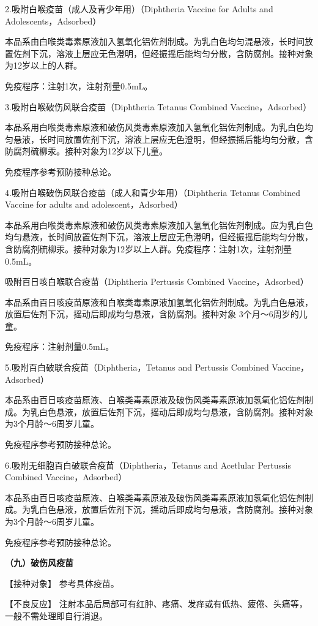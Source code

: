 2.吸附白喉疫苗（成人及青少年用）（Diphtheria Vaccine for Adults and
Adolescents，Adsorbed）

本品系由白喉类毒素原液加入氢氧化铝佐剂制成。为乳白色均匀混悬液，长时间放置佐剂下沉，溶液上层应无色澄明，但经振摇后能均匀分散，含防腐剂。接种对象为12岁以上的人群。

免疫程序：注射1次，注射剂量0.5mL。

3.吸附白喉破伤风联合疫苗（Diphtheria Tetanus Combined
Vaccine，Adsorbed）

本品系用白喉类毒素原液和破伤风类毒素原液加入氢氧化铝佐剂制成。为乳白色均匀悬液，长时间放置佐剂下沉，溶液上层应无色澄明，但经振摇后能均匀分散，含防腐剂硫柳汞。接种对象为12岁以下儿童。

免疫程序参考预防接种总论。

4.吸附白喉破伤风联合疫苗（成人和青少年用）（Diphtheria Tetanus Combined
Vaccine for adults and adolescent，Adsorbed）

本品系用白喉类毒素原液和破伤风类毒素原液加入氢氧化铝佐剂制成。应为乳白色均匀悬液，长时间放置佐剂下沉，溶液上层应无色澄明，但经振摇后能均匀分散，含防腐剂硫柳汞。接种对象为12岁以上人群。免疫程序：注射1次，注射剂量0.5mL。

吸附百日咳白喉联合疫苗（Diphtheria Pertussis Combined
Vaccine，Adsorbed）

本品系由百日咳疫苗原液和白喉类毒素原液加氢氧化铝佐剂制成。为乳白色悬液，放置后佐剂下沉，摇动后即成均匀悬液，含防腐剂。接种对象
3个月～6周岁的儿童。

免疫程序：注射剂量0.5mL。

5.吸附百白破联合疫苗（Diphtheria，Tetanus and Pertussis Combined
Vaccine，Adsorbed）

本品系由百日咳疫苗原液、白喉类毒素原液及破伤风类毒素原液加氢氧化铝佐剂制成。为乳白色悬液，放置后佐剂下沉，摇动后即成均匀悬液，含防腐剂。接种对象为3个月龄～6周岁儿童。

免疫程序参考预防接种总论。

6.吸附无细胞百白破联合疫苗（Diphtheria，Tetanus and Acetlular Pertussis
Combined Vaccine，Adsorbed）

本品系由百日咳疫苗原液、白喉类毒素原液及破伤风类毒素原液加氢氧化铝佐剂制成。为乳白色悬液，放置后佐剂下沉，摇动后即成均匀悬液，含防腐剂。接种对象为3个月龄～6周岁儿童。

免疫程序参考预防接种总论。

\textbf{（九）破伤风疫苗}

【接种对象】 参考具体疫苗。

【不良反应】
注射本品后局部可有红肿、疼痛、发痒或有低热、疲倦、头痛等，一般不需处理即自行消退。

